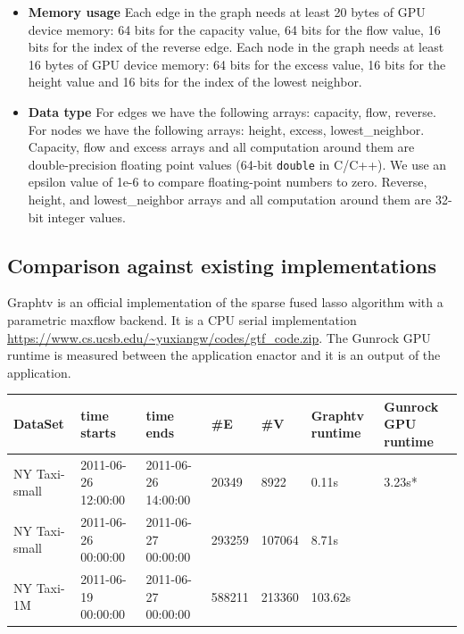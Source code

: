 \documentclass[10pt,oneside]{memoir}
\begin{document}
\begin{itemize}
\item
  \textbf{Memory usage} Each edge in the graph needs at least 20 bytes
  of GPU device memory: 64 bits for the capacity value, 64 bits for the
  flow value, 16 bits for the index of the reverse edge. Each node in
  the graph needs at least 16 bytes of GPU device memory: 64 bits for
  the excess value, 16 bits for the height value and 16 bits for the
  index of the lowest neighbor.
\item
  \textbf{Data type} For edges we have the following arrays: capacity,
  flow, reverse. For nodes we have the following arrays: height, excess,
  lowest\_neighbor. Capacity, flow and excess arrays and all computation
  around them are double-precision floating point values (64-bit
  \texttt{double} in C/C++). We use an epsilon value of 1e-6 to compare
  floating-point numbers to zero. Reverse, height, and lowest\_neighbor
  arrays and all computation around them are 32-bit integer values.
\end{itemize}

\hypertarget{comparison-against-existing-implementations-8}{%
\subsection{Comparison against existing
implementations}\label{comparison-against-existing-implementations-8}}

Graphtv is an official implementation of the sparse fused lasso
algorithm with a parametric maxflow backend. It is a CPU serial
implementation
\url{https://www.cs.ucsb.edu/~yuxiangw/codes/gtf_code.zip}. The Gunrock
GPU runtime is measured between the application enactor and it is an
output of the application.

\begin{longtable}[]{@{}lllllll@{}}
\toprule
DataSet & time starts & time ends & \#E & \#V & Graphtv runtime &
Gunrock GPU runtime\tabularnewline
\midrule
\endhead
NY Taxi-small & 2011-06-26 12:00:00 & 2011-06-26 14:00:00 & 20349 & 8922
& 0.11s & 3.23s*\tabularnewline
NY Taxi-small & 2011-06-26 00:00:00 & 2011-06-27 00:00:00 & 293259 &
107064 & 8.71s &\tabularnewline
NY Taxi-1M & 2011-06-19 00:00:00 & 2011-06-27 00:00:00 & 588211 & 213360
& 103.62s &\tabularnewline
\bottomrule
\end{longtable}
\end{document}
